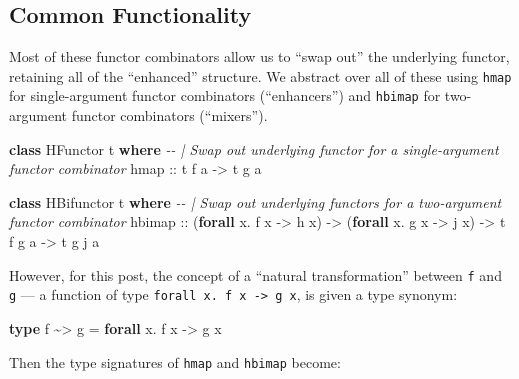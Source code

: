 \documentclass[]{article}
\newenvironment{Shaded}{}{}
\newcommand{\CommentTok}[1]{\textcolor[rgb]{0.38,0.63,0.69}{\textit{#1}}}
\newcommand{\DataTypeTok}[1]{\textcolor[rgb]{0.56,0.13,0.00}{#1}}
\newcommand{\KeywordTok}[1]{\textcolor[rgb]{0.00,0.44,0.13}{\textbf{#1}}}
\newcommand{\NormalTok}[1]{#1}
\newcommand{\OperatorTok}[1]{\textcolor[rgb]{0.40,0.40,0.40}{#1}}
\newcommand{\OtherTok}[1]{\textcolor[rgb]{0.00,0.44,0.13}{#1}}
\begin{document}
\hypertarget{common-functionality}{%
\subsection{Common Functionality}\label{common-functionality}}

Most of these functor combinators allow us to ``swap out'' the underlying
functor, retaining all of the ``enhanced'' structure. We abstract over all of
these using \texttt{hmap} for single-argument functor combinators
(``enhancers'') and \texttt{hbimap} for two-argument functor combinators
(``mixers'').

\begin{Shaded}
\begin{Highlighting}[]
\KeywordTok{class} \DataTypeTok{HFunctor}\NormalTok{ t }\KeywordTok{where}
    \CommentTok{{-}{-} | Swap out underlying functor for a single{-}argument functor combinator}
\NormalTok{    hmap}
\OtherTok{        ::}\NormalTok{ t f a }\OtherTok{{-}>}\NormalTok{ t g a}

\KeywordTok{class} \DataTypeTok{HBifunctor}\NormalTok{ t }\KeywordTok{where}
    \CommentTok{{-}{-} | Swap out underlying functors for a two{-}argument functor combinator}
\NormalTok{    hbimap}
\OtherTok{        ::}\NormalTok{ (}\KeywordTok{forall}\NormalTok{ x}\OperatorTok{.}\NormalTok{ f x }\OtherTok{{-}>}\NormalTok{ h x)}
        \OtherTok{{-}>}\NormalTok{ (}\KeywordTok{forall}\NormalTok{ x}\OperatorTok{.}\NormalTok{ g x }\OtherTok{{-}>}\NormalTok{ j x)}
        \OtherTok{{-}>}\NormalTok{ t f g a}
        \OtherTok{{-}>}\NormalTok{ t g j a}
\end{Highlighting}
\end{Shaded}

However, for this post, the concept of a ``natural transformation'' between
\texttt{f} and \texttt{g} --- a function of type
\texttt{forall\ x.\ f\ x\ -\textgreater{}\ g\ x}, is given a type synonym:

\begin{Shaded}
\begin{Highlighting}[]
\KeywordTok{type}\NormalTok{ f }\OperatorTok{\textasciitilde{}>}\NormalTok{ g }\OtherTok{=} \KeywordTok{forall}\NormalTok{ x}\OperatorTok{.}\NormalTok{ f x }\OtherTok{{-}>}\NormalTok{ g x}
\end{Highlighting}
\end{Shaded}

Then the type signatures of \texttt{hmap} and \texttt{hbimap} become:
\end{document}
